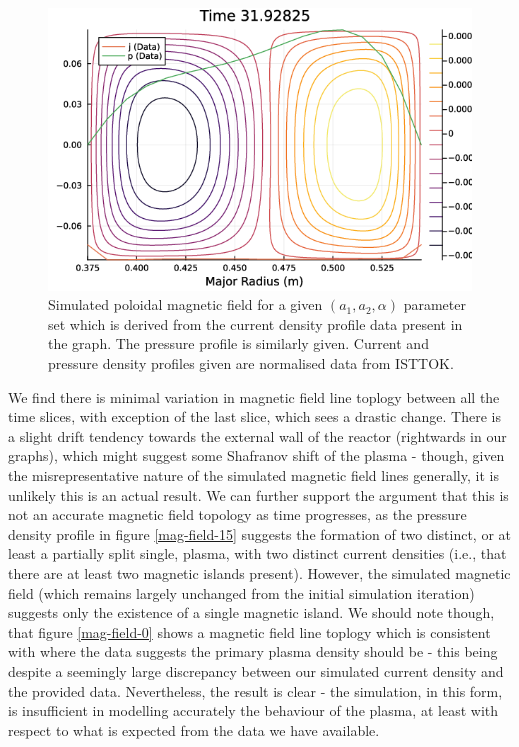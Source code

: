 \begin{figure}[h!]
    \centering
    \includegraphics[scale=0.55]{imgs/c5/magnetic-field-20.png}
    \caption{Simulated poloidal magnetic field for a given $(a_1, a_2, \alpha)$ parameter set which is derived 
    from the current density profile data present in the graph. The pressure profile is similarly given. Current and 
    pressure density profiles given are normalised data from ISTTOK.}
    \label{mag-field-20}
\end{figure}\newpage
We find there is minimal variation in magnetic field line toplogy between all the time slices, with exception 
of the last slice, which sees a drastic change. There is a slight drift tendency towards the external wall of the reactor (rightwards in our graphs), 
which might suggest some Shafranov shift of the plasma - though, given the misrepresentative nature of the simulated 
magnetic field lines generally, it is unlikely this is an actual result. We can further support the argument that 
this is not an accurate magnetic field topology as time progresses, as the pressure density profile in 
figure \ref{mag-field-15} suggests the formation of two distinct, or at least a partially split single, plasma, with two 
distinct current densities (i.e., that there are at least two magnetic islands present). However, the simulated magnetic field (which remains largely unchanged from the 
initial simulation iteration) suggests only the existence of a single magnetic island. We should note though, that 
figure \ref{mag-field-0} shows a magnetic field line toplogy which is consistent with where the data suggests the primary 
plasma density should be - this being despite a seemingly large discrepancy between our simulated current density and the 
provided data. Nevertheless, the result is clear - the simulation, in this form, is insufficient in modelling accurately the behaviour of the 
plasma, at least with respect to what is expected from the data we have available.

